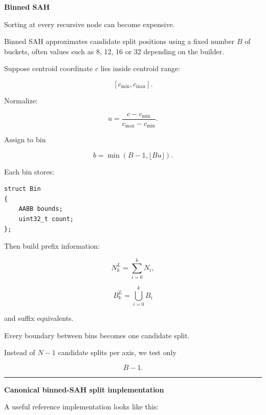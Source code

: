 \textbf{Binned SAH}

Sorting at every recursive node can become expensive.

Binned SAH approximates candidate split positions using a fixed number \(B\) of buckets, often values such as 8, 12, 16 or 32 depending on the builder.

Suppose centroid coordinate \(c\) lies inside centroid range:

\[
[c_{\min},c_{\max}].
\]

Normalize:

\[
u=
\frac{c-c_{\min}}
{c_{\max}-c_{\min}}.
\]

Assign to bin

\[
b=
\min(
B-1,
\lfloor Bu\rfloor
).
\]

Each bin stores:

\begin{verbatim}
struct Bin
{
    AABB bounds;
    uint32_t count;
};
\end{verbatim}

Then build prefix information:

\[
N^L_k
=
\sum_{i=0}^{k}N_i,
\]

\[
B^L_k
=
\bigcup_{i=0}^{k}B_i
\]

and suffix equivalents.

Every boundary between bins becomes one candidate split.

Instead of \(N-1\) candidate splits per axis, we test only

\[
B-1.
\]

\begin{center}\rule{0.5\linewidth}{0.5pt}\end{center}

\textbf{Canonical binned-SAH split implementation}

A useful reference implementation looks like this:

